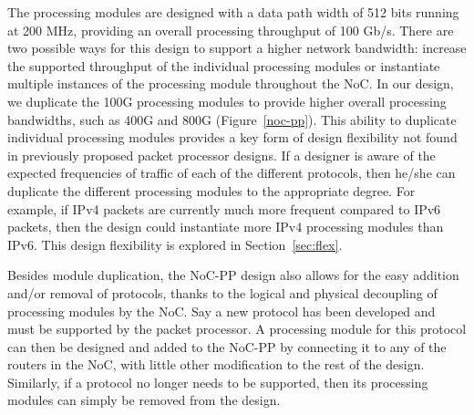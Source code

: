 The processing modules are designed with a data path width of 512 bits running at 200 MHz, providing an overall processing throughput of 100 Gb/s.
There are two possible ways for this design to support a higher network bandwidth: increase the supported throughput of the individual processing modules or instantiate multiple instances of the processing module throughout the NoC.
In our design, we duplicate the 100G processing modules to provide higher overall processing bandwidths, such as 400G and 800G (Figure~\ref{noc-pp}).
This ability to duplicate individual processing modules provides a key form of design flexibility not found in previously proposed packet processor designs.
If a designer is aware of the expected frequencies of traffic of each of the different protocols, then he/she can duplicate the different processing modules to the appropriate degree.
For example, if IPv4 packets are currently much more frequent compared to IPv6 packets, then the design could instantiate more IPv4 processing modules than IPv6.
This design flexibility is explored in Section~\ref{sec:flex}.

Besides module duplication, the NoC-PP design also allows for the easy addition and/or removal of protocols, thanks to the logical and physical decoupling of processing modules by the NoC.
Say a new protocol has been developed and must be supported by the packet processor.
A processing module for this protocol can then be designed and added to the NoC-PP by connecting it to any of the routers in the NoC, with little other modification to the rest of the design.
Similarly, if a protocol no longer needs to be supported, then its processing modules can simply be removed from the design.

